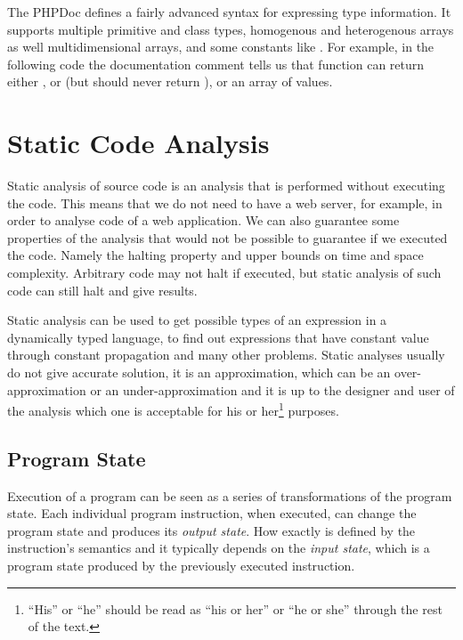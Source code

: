     The PHPDoc defines a fairly advanced syntax for expressing 
    type information. It supports multiple 
    primitive and class types, homogenous and heterogenous arrays as well 
    multidimensional arrays, and some constants like .
    For example, in the following code the documentation 
    comment tells us that function  can return 
    either , or  (but should never 
    return ), or an array of  values.
    
    
    \section{Static Code Analysis}       
        Static analysis of source code is an analysis that is performed without 
        executing the code. This means that we do not need to have a
        web server, for example, in order to analyse code of a web application. 
        We can also guarantee some properties of the analysis that would not 
        be possible to guarantee if we executed the code. Namely the halting property and 
        upper bounds on time and space complexity. Arbitrary code may not 
        halt if executed, but static analysis of such code can still halt 
        and give results.
        
        Static analysis can be used to get possible types of an expression in 
        a dynamically typed language, to find out expressions that have constant 
        value through constant propagation and many other problems. 
        Static analyses usually do not give accurate solution, it is an approximation, 
        which can be an over-approximation or an under-approximation and it is up 
        to the designer and user of the analysis which one is acceptable for 
        his or her\footnote{``His'' or ``he'' 
        should be read as ``his or her'' or ``he or she'' through the rest of the text.} 
        purposes.
        
        \subsection{Program State}
        Execution of a program can be seen as a series of transformations of 
        the program state. Each individual program instruction, when executed, 
        can change the program state and produces its \emph{output state}.         
        How exactly is defined by the instruction's semantics and it typically 
        depends on the \emph{input state}, which is a program state produced 
        by the previously executed instruction. 
        

